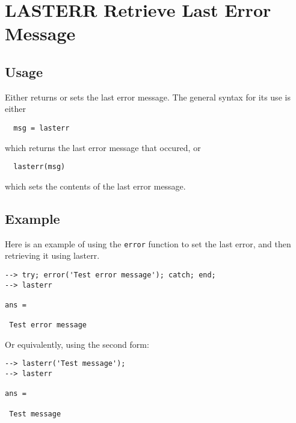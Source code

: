 \section{LASTERR Retrieve Last Error Message}

\subsection{Usage}

Either returns or sets the last error message.  The
general syntax for its use is either
\begin{verbatim}
  msg = lasterr
\end{verbatim}
which returns the last error message that occured, or
\begin{verbatim}
  lasterr(msg)
\end{verbatim}
which sets the contents of the last error message.
\subsection{Example}

Here is an example of using the \verb|error| function to
set the last error, and then retrieving it using
lasterr.
\begin{verbatim}
--> try; error('Test error message'); catch; end;
--> lasterr

ans = 

 Test error message
\end{verbatim}
Or equivalently, using the second form:
\begin{verbatim}
--> lasterr('Test message');
--> lasterr

ans = 

 Test message
\end{verbatim}

